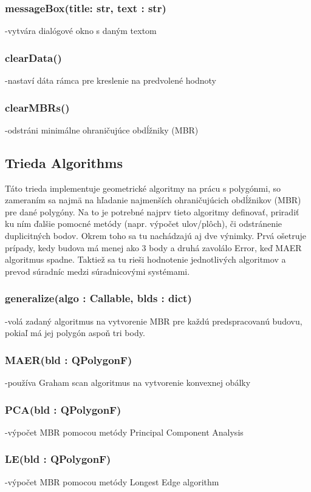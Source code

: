 \documentclass[12pt]{article}
\begin{document}
\subsubsection*{messageBox(title: str, text : str)}
\noindent-vytvára dialógové okno s daným textom
\subsubsection*{clearData()}
\noindent-nastaví dáta rámca pre kreslenie na predvolené hodnoty
\subsubsection*{clearMBRs()}
\noindent-odstráni minimálne ohraničujúce obdĺžniky (MBR)
\subsection*{Trieda Algorithms}
Táto trieda implementuje geometrické algoritmy na prácu s polygónmi, so zameraním sa najmä na hľadanie najmenších ohraničujúcich obdĺžnikov (MBR) pre dané polygóny. Na to je potrebné najprv tieto algoritmy definovať, priradiť ku ním ďalšie pomocné metódy (napr. výpočet ulov/plôch), či odstránenie duplicitných bodov. Okrem toho sa tu nachádzajú aj dve výnimky. Prvá ošetruje prípady, kedy budova má menej ako 3 body a druhá zavolálo Error, keď MAER algoritmus spadne. Taktiež sa tu rieši hodnotenie jednotlivých algoritmov a prevod súradníc medzi súradnicovými systémami.
\subsubsection*{generalize(algo : Callable, blds : dict)}
\noindent-volá zadaný algoritmus na vytvorenie MBR pre každú predspracovanú budovu, pokiaľ má jej polygón aspoň tri body. 
\subsubsection*{MAER(bld : QPolygonF)}
\noindent-používa Graham scan algoritmus na vytvorenie konvexnej obálky
\subsubsection*{PCA(bld : QPolygonF)}
\noindent-výpočet MBR pomocou metódy Principal Component Analysis
\subsubsection*{LE(bld : QPolygonF)}
\noindent-výpočet MBR pomocou metódy Longest Edge algorithm
\end{document}
